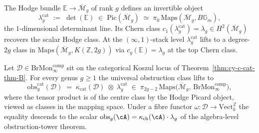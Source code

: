 \begin{definition}
\label{def:cy-c-cat-hodge-bundle}
The Hodge bundle $\mathbb E \to \overline{\mathcal M}_g$ of rank $g$
defines an invertible object
\[
 \lambda_g^{\mathrm{cat}}
 \;:=\;
 \det(\mathbb E)
 \;\in\;
 \mathrm{Pic}(\overline{\mathcal M}_g)
 \;\simeq\;
 \pi_0 \, \mathrm{Maps}(\overline{\mathcal M}_g, B \mathbb G_m),
\]
the $1$-dimensional determinant line. Its Chern class
$c_1(\lambda_g^{\mathrm{cat}}) = \lambda_g \in H^2(\overline{\mathcal M}_g)$
recovers the scalar Hodge class. At the $(\infty,1)$-stack level
$\lambda_g^{\mathrm{cat}}$ lifts to a degree-$2g$ class in
$\mathrm{Maps}(\overline{\mathcal M}_g, K(\mathbb Z, 2g))$ via
$c_g(\mathbb E) = \lambda_g$ at the top Chern class.
\end{definition}

\begin{theorem}
\label{thm:cy-c-cat-thm-D}
Let $\mathcal D \in \mathrm{BrMon}^{\mathrm{comp}}_\infty$ sit on the
categorical Koszul locus of Theorem~\ref{thm:cy-c-cat-thm-B}. For every
genus $g \geq 1$ the universal obstruction class lifts to
\[
 \mathrm{obs}_g^{\mathrm{cat}}(\mathcal D)
 \;=\;
 \kappa_{\mathrm{cat}}(\mathcal D)
 \;\otimes\;
 \lambda_g^{\mathrm{cat}}
 \;\in\;
 \pi_{2g-2}\,
 \mathrm{Maps}\!\bigl(\overline{\mathcal M}_g,\,
 \mathrm{BrMon}^{\mathrm{comp}}_\infty\bigr),
\]
where the tensor product is of the centre class by the Hodge Picard
object, viewed as classes in the mapping space. Under a fibre functor
$\omega : \mathcal D \to \mathrm{Vect}_k^{\mathbb Z}$ the equality
descends to the scalar
$\mathrm{obs}_g(\cA) = \kappa_{\mathrm{ch}}(\cA) \cdot \lambda_g$ of the
algebra-level obstruction-tower theorem.
\end{theorem}

